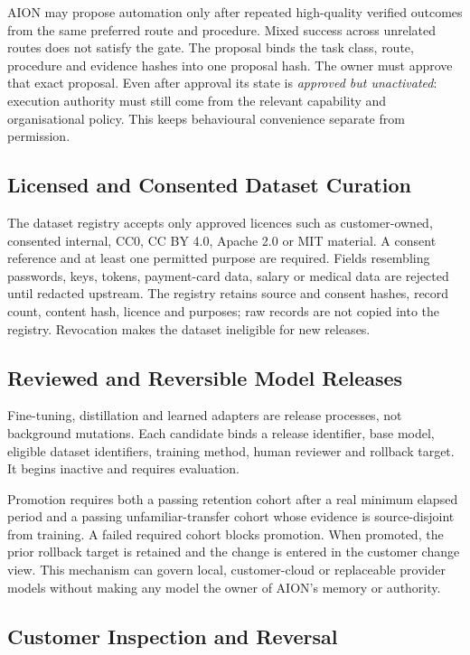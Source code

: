 AION may propose automation only after repeated high-quality verified outcomes from the same
preferred route and procedure.  Mixed success across unrelated routes does not satisfy the gate.
The proposal binds the task class, route, procedure and evidence hashes into one proposal hash.
The owner must approve that exact proposal.  Even after approval its state is
\emph{approved but unactivated}: execution authority must still come from the relevant capability
and organisational policy.  This keeps behavioural convenience separate from permission.

\subsection{Licensed and Consented Dataset Curation}

The dataset registry accepts only approved licences such as customer-owned, consented internal,
CC0, CC BY 4.0, Apache 2.0 or MIT material.  A consent reference and at least one permitted purpose
are required.  Fields resembling passwords, keys, tokens, payment-card data, salary or medical data
are rejected until redacted upstream.  The registry retains source and consent hashes, record count,
content hash, licence and purposes; raw records are not copied into the registry.  Revocation makes
the dataset ineligible for new releases.

\subsection{Reviewed and Reversible Model Releases}

Fine-tuning, distillation and learned adapters are release processes, not background mutations.
Each candidate binds a release identifier, base model, eligible dataset identifiers, training method,
human reviewer and rollback target.  It begins inactive and requires evaluation.

Promotion requires both a passing retention cohort after a real minimum elapsed period and a passing
unfamiliar-transfer cohort whose evidence is source-disjoint from training.  A failed required cohort
blocks promotion.  When promoted, the prior rollback target is retained and the change is entered in
the customer change view.  This mechanism can govern local, customer-cloud or replaceable provider
models without making any model the owner of AION's memory or authority.

\subsection{Customer Inspection and Reversal}

